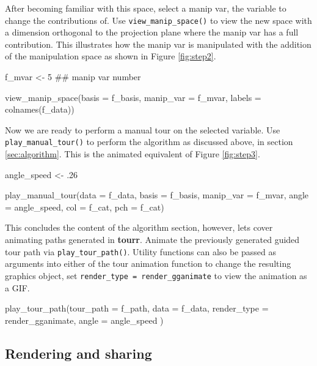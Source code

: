 After becoming familiar with this space, select a manip var, the
variable to change the contributions of. Use
\texttt{view\_manip\_space()} to view the new space with a dimension
orthogonal to the projection plane where the manip var has a full
contribution. This illustrates how the manip var is manipulated with the
addition of the manipulation space as shown in Figure \ref{fig:step2}.

\begin{Schunk}
\begin{Sinput}
f_mvar  <- 5  ## manip var number

view_manip_space(basis = f_basis, 
                 manip_var = f_mvar, 
                 labels = colnames(f_data))
\end{Sinput}
\end{Schunk}

Now we are ready to perform a manual tour on the selected variable. Use
\texttt{play\_manual\_tour()} to perform the algorithm as discussed
above, in section \ref{sec:algorithm}. This is the animated equivalent
of Figure \ref{fig:step3}.

\begin{Schunk}
\begin{Sinput}
angle_speed <- .26

play_manual_tour(data = f_data,
                 basis = f_basis, 
                 manip_var = f_mvar, 
                 angle = angle_speed,
                 col = f_cat,
                 pch = f_cat)
\end{Sinput}
\end{Schunk}

This concludes the content of the algorithm section, however, lets cover
animating paths generated in \textbf{tourr}. Animate the previously
generated guided tour path via \texttt{play\_tour\_path()}. Utility
functions can also be passed as arguments into either of the tour
animation function to change the resulting graphics object, set
\texttt{render\_type\ =\ render\_gganimate} to view the animation as a
GIF.

\begin{Schunk}
\begin{Sinput}
play_tour_path(tour_path = f_path,
               data = f_data,
               render_type = render_gganimate, 
               angle = angle_speed
)
\end{Sinput}
\end{Schunk}

\hypertarget{rendering-and-sharing}{%
\subsection{Rendering and sharing}\label{rendering-and-sharing}}

